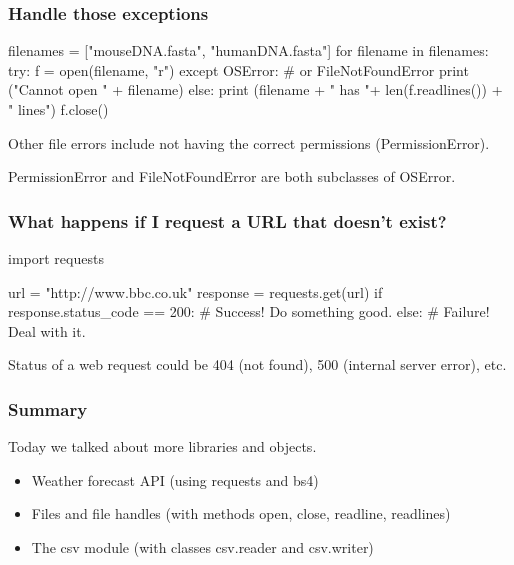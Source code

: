 \documentclass{beamer}
\begin{document}
\begin{frame}[fragile]
\frametitle{Handle those exceptions}
\begin{code} 
filenames = ["mouseDNA.fasta", "humanDNA.fasta"]
for filename in filenames:
   try:
      f = open(filename, "r")
   except OSError: # or FileNotFoundError
      print ("Cannot open " + filename)
   else:
      print (filename + " has "+ len(f.readlines()) 
               + " lines")
      f.close()
\end{code}
Other file errors include not having the correct permissions (PermissionError). 

PermissionError and FileNotFoundError are both subclasses of OSError.
\end{frame}


\begin{frame}[fragile]
\frametitle{What happens if I request a URL that doesn't exist?}
\begin{code}
import requests

url = "http://www.bbc.co.uk"
response = requests.get(url)
if response.status_code == 200:
   # Success! Do something good.
else:
   # Failure! Deal with it.
\end{code}
Status of a web request could be 404 (not found), 500 (internal server error), etc. 
\end{frame}


\begin{frame}[fragile]
\frametitle{Summary}
Today we talked about more libraries and objects. 
\begin{itemize}
\item Weather forecast API (using requests and bs4)
\item Files and file handles (with methods open, close, readline, readlines)
\item The csv module (with classes csv.reader and csv.writer)
\end{itemize}
\end{frame}
\end{document}

